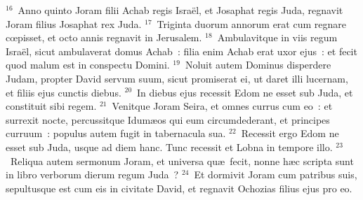 ${}^{16}$~Anno quinto Joram filii Achab regis Isra\"el, et Josaphat regis Juda, regnavit Joram filius Josaphat rex Juda.
${}^{17}$~Triginta duorum annorum erat cum regnare cœpisset, et octo annis regnavit in Jerusalem.
${}^{18}$~Ambulavitque in viis regum Isra\"el, sicut ambulaverat domus Achab~: filia enim Achab erat uxor ejus~: et fecit quod malum est in conspectu Domini.
${}^{19}$~Noluit autem Dominus disperdere Judam, propter David servum suum, sicut promiserat ei, ut daret illi lucernam, et filiis ejus cunctis diebus.
${}^{20}$~In diebus ejus recessit Edom ne esset sub Juda, et constituit sibi regem.
${}^{21}$~Venitque Joram Seira, et omnes currus cum eo~: et surrexit nocte, percussitque Idum\ae os qui eum circumdederant, et principes curruum~: populus autem fugit in tabernacula sua.
${}^{22}$~Recessit ergo Edom ne esset sub Juda, usque ad diem hanc. Tunc recessit et Lobna in tempore illo.
${}^{23}$~Reliqua autem sermonum Joram, et universa qu\ae\ fecit, nonne h\ae c scripta sunt in libro verborum dierum regum Juda~?
${}^{24}$~Et dormivit Joram cum patribus suis, sepultusque est cum eis in civitate David, et regnavit Ochozias filius ejus pro eo.


